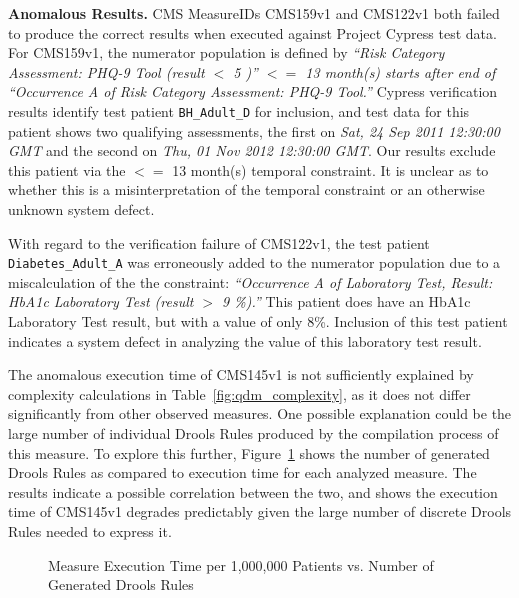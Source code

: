 \documentclass{amia}
\begin{document}
\textbf{Anomalous Results.}
CMS MeasureIDs CMS159v1 and CMS122v1 both failed to produce the correct results when executed against Project Cypress test data. For CMS159v1, the numerator population is defined by
\textit{``Risk Category Assessment: PHQ-9 Tool (result $<$ 5 )'' $<=$ 13 month(s) starts after end of ``Occurrence A of Risk Category Assessment: PHQ-9 Tool.''}
Cypress verification results identify test patient \texttt{BH\_Adult\_D} for inclusion, and test data for this patient shows two qualifying assessments, the first on \textit{Sat, 24 Sep 2011 12:30:00 GMT} and the second on \textit{Thu, 01 Nov 2012 12:30:00 GMT}. Our results exclude this patient via the $<=$ 13 month(s) temporal constraint. It is unclear as to whether this is a misinterpretation of the temporal constraint or an otherwise unknown system defect.

With regard to the verification failure of CMS122v1, the test patient \texttt{Diabetes\_Adult\_A} was erroneously added to the numerator population due to a miscalculation of the the constraint:
\textit{``Occurrence A of Laboratory Test, Result: HbA1c Laboratory Test (result $>$ 9 \%).''} This patient does have an HbA1c Laboratory Test result, but with a value of only 8\%. Inclusion of this test patient indicates a system defect in analyzing the value of this laboratory test result.

The anomalous execution time of CMS145v1 is not sufficiently explained by complexity calculations in Table~\ref{fig:qdm_complexity}, as it does not differ significantly from other observed measures. One possible explanation could be the large number of individual Drools Rules produced by the compilation process of this measure. To explore this further, Figure~\ref{fig:qdm_drools_rules_generation} shows the number of generated Drools Rules as compared to execution time for each analyzed measure. The results indicate a possible correlation between the two, and shows the execution time of CMS145v1 degrades predictably given the large number of discrete Drools Rules needed to express it.

\begin{figure}%
\centering
{}
\caption{Measure Execution Time per 1,000,000 Patients vs. Number of Generated Drools Rules} 
\label{fig:qdm_drools_rules_generation}
\end{figure}
\end{document}
